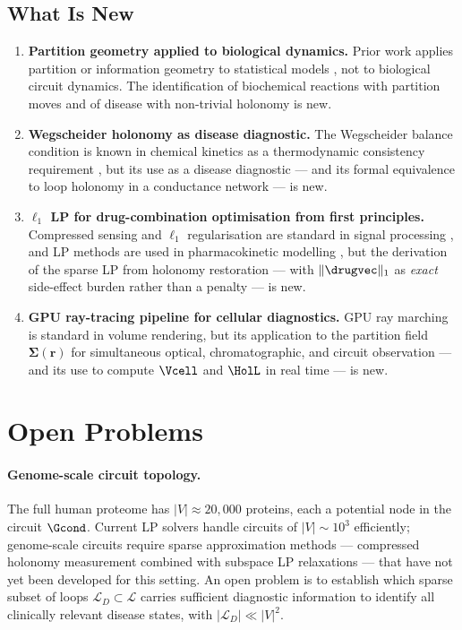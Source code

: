 \subsection{What Is New}

\begin{enumerate}[leftmargin=2em]
  \item \textbf{Partition geometry applied to biological dynamics.}
    Prior work applies partition or information geometry to statistical models
    \citep{Amari2000}, not to biological circuit dynamics.  The identification
    of biochemical reactions with partition moves and of disease with
    non-trivial holonomy is new.

  \item \textbf{Wegscheider holonomy as disease diagnostic.}
    The Wegscheider balance condition is known in chemical kinetics as a
    thermodynamic consistency requirement \citep{Wegscheider1901}, but its
    use as a disease diagnostic — and its formal equivalence to loop holonomy
    in a conductance network — is new.

  \item \textbf{$\ell_1$ LP for drug-combination optimisation from first principles.}
    Compressed sensing and $\ell_1$ regularisation are standard in signal
    processing \citep{Candes2006}, and LP methods are used in pharmacokinetic
    modelling \citep{Gabrielsson2006}, but the derivation of the sparse LP
    from holonomy restoration — with $\|\drugvec\|_1$ as \emph{exact}
    side-effect burden rather than a penalty — is new.

  \item \textbf{GPU ray-tracing pipeline for cellular diagnostics.}
    GPU ray marching is standard in volume rendering, but its application to
    the partition field $\boldsymbol{\Sigma}(\mathbf{r})$ for simultaneous
    optical, chromatographic, and circuit observation — and its use to compute
    $\Vcell$ and $\HolL$ in real time — is new.
\end{enumerate}

\section{Open Problems}
\label{sec:open-problems}

\paragraph{Genome-scale circuit topology.}
The full human proteome has $|V| \approx 20{,}000$ proteins, each a potential
node in the circuit $\Gcond$.  Current LP solvers handle circuits of
$|V| \sim 10^3$ efficiently; genome-scale circuits require sparse approximation
methods — compressed holonomy measurement combined with subspace LP relaxations
— that have not yet been developed for this setting.  An open problem is to
establish which sparse subset of loops $\mathcal{L}_D \subset \mathcal{L}$
carries sufficient diagnostic information to identify all clinically relevant
disease states, with $|\mathcal{L}_D| \ll |V|^2$.

